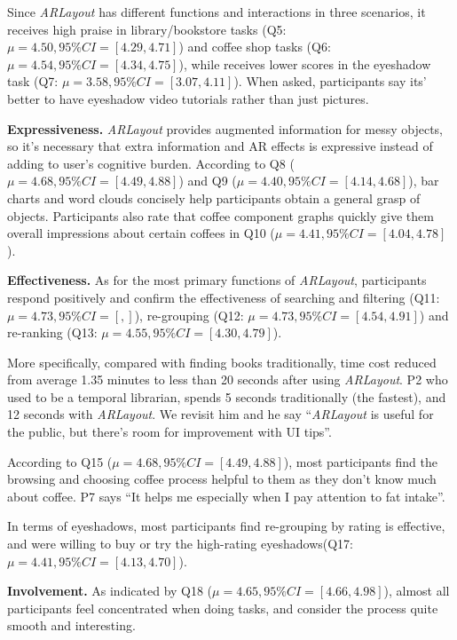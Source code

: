 Since \textit{ARLayout} has different functions and interactions in three scenarios, it receives high praise
in library/bookstore tasks (Q5: $\mu = 4.50, 95\% CI = [4.29,4.71]$) and coffee shop tasks (Q6: $\mu = 4.54, 95\% CI = [4.34,4.75]$),
while receives lower scores in the eyeshadow task (Q7: $\mu = 3.58, 95\% CI = [3.07,4.11]$).
When asked, participants say its' better to have eyeshadow video tutorials rather than just pictures.

\textbf{Expressiveness.} \textit{ARLayout} provides augmented information for messy objects, so it's necessary
that extra information and AR effects is expressive instead of adding to user's cognitive burden.
According to Q8 ($\mu = 4.68, 95\% CI = [4.49,4.88]$) and Q9 ($\mu = 4.40, 95\% CI = [4.14,4.68]$),
bar charts and word clouds concisely help participants obtain a general grasp of objects.
Participants also rate that coffee component graphs quickly give them overall impressions about
certain coffees in Q10 ($\mu = 4.41, 95\% CI = [4.04,4.78]$).

\textbf{Effectiveness.} As for the most primary functions of \textit{ARLayout},
participants respond positively and confirm the effectiveness of searching and filtering (Q11: $\mu = 4.73, 95\% CI = [,]$),
re-grouping (Q12: $\mu = 4.73, 95\% CI = [4.54,4.91]$) and re-ranking (Q13: $\mu = 4.55, 95\% CI = [4.30,4.79]$).

More specifically, compared with finding books traditionally,
time cost reduced from average 1.35 minutes to less than 20 seconds after using \textit{ARLayout}.
P2 who used to be a temporal librarian, spends 5 seconds traditionally (the fastest),
and 12 seconds with \textit{ARLayout}.
We revisit him and he say ``\textit{ARLayout} is useful for the public,
but there's room for improvement with UI tips''.

According to Q15 ($\mu = 4.68, 95\% CI = [4.49,4.88]$),
most participants find the browsing and choosing coffee process
helpful to them as they don't know much about coffee.
P7 says ``It helps me especially when I pay attention to fat intake''.

In terms of eyeshadows, most participants find re-grouping by rating is effective,
and were willing to buy or try the high-rating eyeshadows(Q17: $\mu = 4.41, 95\% CI = [4.13,4.70]$).


\textbf{Involvement.} As indicated by Q18 ($\mu = 4.65, 95\% CI = [4.66,4.98]$), almost all participants
feel concentrated when doing tasks, and consider the process quite smooth and interesting.


